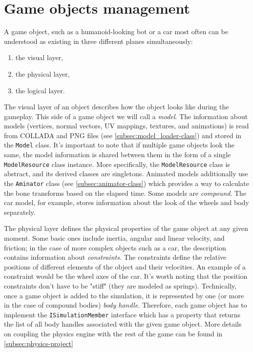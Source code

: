 \section{Game objects management}
A game object, such as a humanoid-looking bot or a car most often can be understood as existing in three different planes simultaneously:
\begin{enumerate}
    \item the visual layer,
    \item the physical layer,
    \item the logical layer.
\end{enumerate}
The visual layer of an object describes how the object looks like during the gameplay.
This side of a game object we will call a \textit{model}.
The information about models (vertices, normal vectors, UV mappings, textures, and animations) is read from COLLADA and PNG files (see \autoref{subsec:model_loader-class}) and stored in the \texttt{Model} class.
It's important to note that if multiple game objects look the same, the model information is shared between them in the form of a single \texttt{ModelResource} class instance.
More specifically, the \texttt{ModelResource} class is abstract, and its derived classes are singletons.
Animated models additionally use the \texttt{Aminator} class (see \autoref{subsec:animator-class}) which provides a way to calculate the bone transforms based on the elapsed time.
Some models are \textit{compound}.
The car model, for example, stores information about the look of the wheels and body separately.

The physical layer defines the physical properties of the game object at any given moment.
Some basic ones include inertia, angular and linear velocity, and friction;
in the case of more complex objects such as a car, the description contains information about \textit{constraints}.
The constraints define the relative positions of different elements of the object and their velocities.
An example of a constraint would be the wheel axes of the car.
It's worth noting that the position constraints don't have to be "stiff" (they are modeled as springs).
Technically, once a game object is added to the simulation, it is represented by one (or more in the case of compound bodies) \textit{body handle}.
Therefore, each game object has to implement the \texttt{ISimulationMember} interface which has a property that returns the list of all body handles associated with the given game object.
More details on coupling the physics engine with the rest of the game can be found in \autoref{subsec:physics-project}

